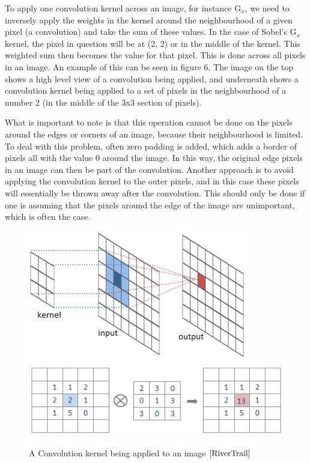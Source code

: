 \documentclass[12pt]{report} %
\begin{document}
	 To apply one convolution kernel across an image, for instance G$_{x}$, we need to inversely apply the weights in the kernel around the neighbourhood of a given pixel (a convolution) and take the sum of these values. In the case of Sobel's G$_{x}$ kernel, the pixel in question will be at (2, 2) or in the middle of the kernel. This weighted sum then becomes the value for that pixel. This is done across all pixels in an image\cite{RiverTrail}. 
	 An example of this can be seen in figure 6. The image on the top shows a high level view of a convolution being applied, and underneath shows a convolution kernel being applied to a set of pixels in the neighbourhood of a number 2 (in the middle of the 3x3 section of pixels).	 
	 
	 What is important to note is that this operation cannot be done on the pixels around the edges or corners of an image, because their neighbourhood is limited. To deal with this problem, often zero padding is added, which adds a border of pixels all with the value 0 around the image. In this way, the original edge pixels in an image can then be part of the convolution. \cite{R. Fisher, S. Perkins, A. Walker and E. Wolfart.} Another approach is to avoid applying the convolution kernel to the outer pixels, and in this case these pixels will essentially be thrown away after the convolution. This should only be done if one is assuming that the pixels around the edge of the image are unimportant, which is often the case.
	 
\begin{figure}
\centering
\includegraphics{RiverTrain-ImageConvDiagram} 
\includegraphics{convolution4}
\caption{A Convolution kernel being applied to an image $\cite{RiverTrail}$}
\end{figure}	 
	 
\end{document}
